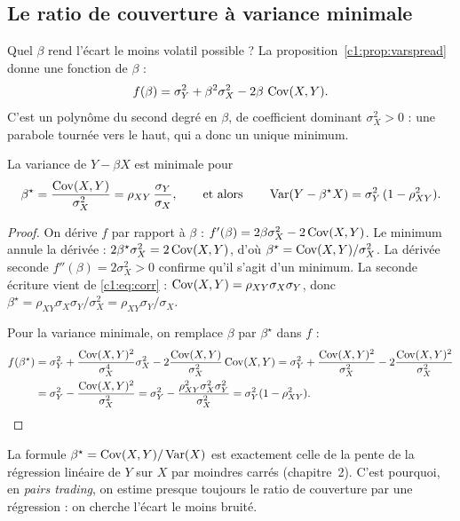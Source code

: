 \subsection{Le ratio de couverture à variance minimale}

Quel $\beta$ rend l'écart le moins volatil possible ? La proposition~\ref{c1:prop:varspread} donne une fonction de $\beta$ :
\[
f(\beta) = \sigma_Y^2 + \beta^2\sigma_X^2 - 2\beta\,\operatorname{Cov}(X,Y).
\]
C'est un polynôme du second degré en $\beta$, de coefficient dominant $\sigma_X^2 > 0$ : une parabole tournée vers le haut, qui a donc un unique minimum.

\begin{proposition}\label{c1:prop:hedge}
La variance de $Y-\beta X$ est minimale pour
\[
\beta^\star = \frac{\operatorname{Cov}(X,Y)}{\sigma_X^2} = \rho_{XY}\,\frac{\sigma_Y}{\sigma_X},
\qquad\text{et alors}\qquad \operatorname{Var}(Y - \beta^\star X) = \sigma_Y^2\,(1-\rho_{XY}^2).
\]
\end{proposition}
\begin{proof}
On dérive $f$ par rapport à $\beta$ : $f'(\beta) = 2\beta\sigma_X^2 - 2\operatorname{Cov}(X,Y)$. Le minimum annule la dérivée : $2\beta^\star\sigma_X^2 = 2\operatorname{Cov}(X,Y)$, d'où $\beta^\star = \operatorname{Cov}(X,Y)/\sigma_X^2$. La dérivée seconde $f''(\beta) = 2\sigma_X^2 > 0$ confirme qu'il s'agit d'un minimum. La seconde écriture vient de \eqref{c1:eq:corr} : $\operatorname{Cov}(X,Y) = \rho_{XY}\sigma_X\sigma_Y$, donc $\beta^\star = \rho_{XY}\sigma_X\sigma_Y/\sigma_X^2 = \rho_{XY}\sigma_Y/\sigma_X$.

Pour la variance minimale, on remplace $\beta$ par $\beta^\star$ dans $f$ :
\begin{align*}
f(\beta^\star) &= \sigma_Y^2 + \frac{\operatorname{Cov}(X,Y)^2}{\sigma_X^4}\sigma_X^2 - 2\frac{\operatorname{Cov}(X,Y)}{\sigma_X^2}\operatorname{Cov}(X,Y)
= \sigma_Y^2 + \frac{\operatorname{Cov}(X,Y)^2}{\sigma_X^2} - 2\frac{\operatorname{Cov}(X,Y)^2}{\sigma_X^2}\\
&= \sigma_Y^2 - \frac{\operatorname{Cov}(X,Y)^2}{\sigma_X^2} = \sigma_Y^2 - \frac{\rho_{XY}^2\sigma_X^2\sigma_Y^2}{\sigma_X^2} = \sigma_Y^2(1-\rho_{XY}^2).
\end{align*}
\end{proof}

\begin{remark}
La formule $\beta^\star = \operatorname{Cov}(X,Y)/\operatorname{Var}(X)$ est exactement celle de la pente de la régression linéaire de $Y$ sur $X$ par moindres carrés (chapitre~2). C'est pourquoi, en \emph{pairs trading}, on estime presque toujours le ratio de couverture par une régression : on cherche l'écart le moins bruité.
\end{remark}

